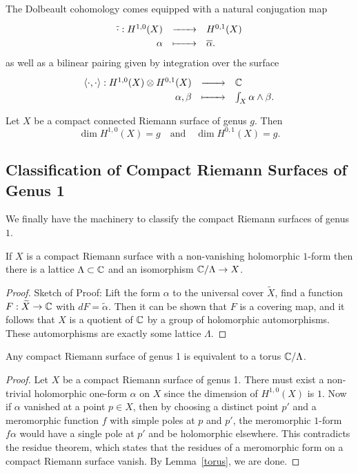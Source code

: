 \documentclass{lkx_paper}
\begin{document}
The Dolbeault cohomology comes equipped with a natural conjugation map \[\definefunction{\overline{\cdot}}{H^{1,0}(X)}{H^{0,1}(X)}{\alpha}{\overline{\alpha}.}\] as well as a bilinear pairing given by integration over the surface
\[
	\definefunction{\langle\cdot,\cdot\rangle}{H^{1,0}(X)\otimes H^{0,1}(X)}{\C}{\alpha,\beta}{\int_X \alpha\wedge \beta.}
\]

\begin{theorem}\label{dim_dolbeult}
	Let $X$ be a compact connected Riemann surface of genus $g$. Then
	\[
		\dim H^{1,0}(X) = g\quad\textrm{and}\quad \dim H^{0,1}(X)=g.
	\]
\end{theorem}

\subsection{Classification of Compact Riemann Surfaces of Genus 1}

We finally have the machinery to classify the compact Riemann surfaces of genus $1$.

\begin{lemma}\label{torus}
	If $X$ is a compact Riemann surface with a non-vanishing holomorphic $1$-form then there is a lattice $\Lambda\subset \mathbb{C}$ and an isomorphism $\mathbb{C}/\Lambda \to X$.
\end{lemma}
\begin{proof}{Sketch of Proof:}
	Lift the form $\alpha$ to the universal cover $\widetilde{X}$, find a function $F : \widetilde{X} \to \mathbb{C}$ with $dF=\widetilde{\alpha}$. Then it can be shown that $F$ is a covering map, and it follows that $X$ is a quotient of $\mathbb{C}$ by a group of holomorphic automorphisms. These automorphisms are exactly some lattice $\Lambda$.
\end{proof}

\begin{theorem}
	Any compact Riemann surface of genus 1 is equivalent to a torus $\mathbb{C}/\Lambda$.
\end{theorem}
\begin{proof}
	Let $X$ be a compact Riemann surface of genus 1. There must exist a non-trivial holomorphic one-form $\alpha$ on $X$ since the dimension of $H^{1,0}(X)$ is $1$. Now if $\alpha$ vanished at a point $p\in X$, then by choosing a distinct point $p'$ and a meromorphic function $f$ with simple poles at $p$ and $p'$, the meromorphic $1$-form $f\alpha$ would have a single pole at $p'$ and be holomorphic elsewhere. This contradicts the residue theorem, which states that the residues of a meromorphic form on a compact Riemann surface vanish. By Lemma~\ref{torus}, we are done.
\end{proof}
\end{document}

